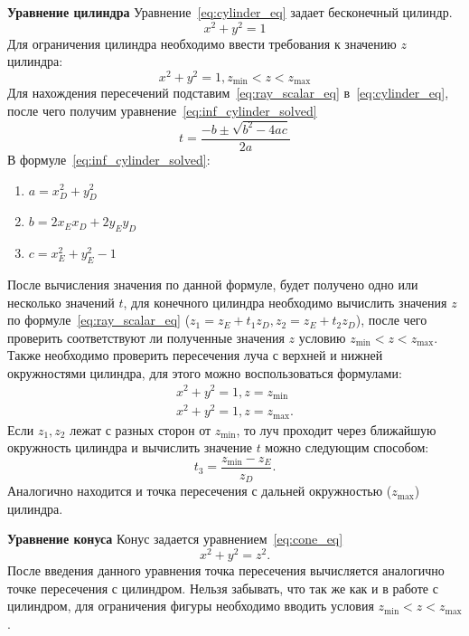 \textbf{Уравнение цилиндра}
Уравнение~\ref{eq:cylinder_eq} задает бесконечный цилиндр.
\begin{equation}
	x^2 + y^2=1
	\label{eq:cylinder_eq}
\end{equation}
Для ограничения цилиндра необходимо ввести требования к значению $z$ цилиндра:
\begin{equation}
	x^2 + y^2=1,z_{\min} < z  < z_{\max}	
	\label{eq:cylinder_eq_demanding}
\end{equation}
Для нахождения пересечений подставим~\ref{eq:ray_scalar_eq} в~\ref{eq:cylinder_eq}, после чего получим уравнение~\ref{eq:inf_cylinder_solved}
\begin{equation}
	t=\frac{-b\pm\sqrt{b^2-4ac}}{2a}
	\label{eq:inf_cylinder_solved}
\end{equation}
В формуле~\ref{eq:inf_cylinder_solved}:
\begin{enumerate}
	\item $a = x_{D}^2 + y_{D}^2$ 
	\item $b = 2x_Ex_D+2y_Ey_D$ 
	\item $c = x_{E}^2+y_{E}^2 - 1$
\end{enumerate}

После вычисления значения по данной формуле, будет получено  одно или несколько значений $t$, для конечного цилиндра необходимо вычислить значения $z$ по
формуле~\ref{eq:ray_scalar_eq} ($z_1 = z_E + t_1z_D,z_2 = z_E + t_2z_D$), после чего проверить соответствуют ли полученные значения $z$ условию $z_{\min} < z  < z_{\max}$.
Также необходимо проверить пересечения луча с верхней и нижней окружностями цилиндра, для этого можно воспользоваться формулами:
\begin{equation}
	\label{eq:cylinder_caps}
	\begin{aligned}
		x^2 + y^2=1,z = z_{\min}\\
		x^2 + y^2=1,z = z_{\max}.
	\end{aligned}
\end{equation}
Если $z_1,z_2$ лежат с разных сторон от $z_{\min}$, то луч проходит через ближайшую окружность цилиндра и вычислить значение $t$ можно следующим способом:
\begin{equation}
	t_3=\frac{z_{\min}-z_E}{z_D}.
	\label{eq:cylinder_caps_solved}
\end{equation}
Аналогично находится и точка пересечения с дальней окружностью ($z_{\max}$) цилиндра.\cite{primitives_raytracing_equations}


\textbf{Уравнение конуса}
Конус задается уравнением~\ref{eq:cone_eq}
\begin{equation}
	x^2+y^2=z^2.
	\label{eq:cone_eq}
\end{equation}
После введения данного уравнения точка пересечения вычисляется аналогично точке пересечения с цилиндром. Нельзя забывать, что так же как и в работе с цилиндром, для
ограничения фигуры необходимо вводить условия $z_{\min} < z < z_{\max}$.

